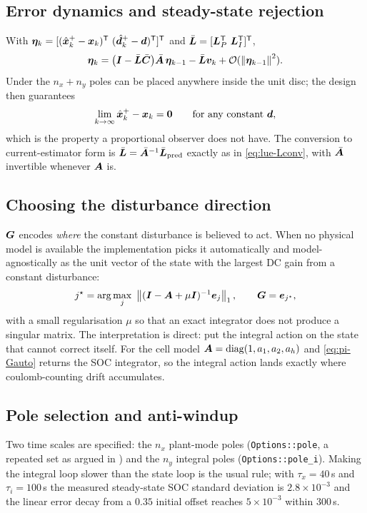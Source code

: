\subsection{Error dynamics and steady-state rejection}
With $\bm{\eta}_k = [(\xplus_k-\vx_k)^\T\ (\hat{\bm{d}}^+_k-\bm{d})^\T]^\T$ and
$\bar{\bm{L}} = [\bm{L}_P^{\mathsf{T}}\ \bm{L}_I^{\mathsf{T}}]^{\mathsf{T}}$,
\begin{equation}
\bm{\eta}_k = \big(\bm{I} - \bar{\bm{L}}\bar{\bm{C}}\big)\bar{\bm{A}}\,\bm{\eta}_{k-1}
            - \bar{\bm{L}}\bm{v}_k + \mathcal{O}(\left\lVert \bm{\eta}_{k-1} \right\rVert^2) .
\label{eq:pi-err}
\end{equation}
Under  the $n_x+n_y$ poles can be placed anywhere inside the unit disc; the
design then guarantees
\begin{equation}
\lim_{k\to\infty}\hat{\bm{x}}^{+}_k - \bm{x}_k = \bm{0}
\qquad\text{for any constant }\bm{d},
\label{eq:pi-zero}
\end{equation}
which is the property a proportional observer does not have.  The conversion to
current-estimator form is $\bar{\bm{L}} = \bar{\bm{A}}^{-1}\bar{\bm{L}}_{\mathrm{pred}}$ exactly as in
\eqref{eq:lue-Lconv}, with $\bar{\bm{A}}$ invertible whenever $\bm{A}$ is.

\subsection{Choosing the disturbance direction}
\label{sec:pi-G}
$\bm{G}$ encodes \emph{where} the constant disturbance is believed to act.  When no physical model
is available the implementation picks it automatically and model-agnostically as the unit vector
of the state with the largest DC gain from a constant disturbance:
\begin{equation}
j^\star = \arg\max_j \ \left\lVert (\bm{I}-\bm{A}+\mu\bm{I})^{-1} \bm{e}_j \right\rVert_1 ,
\qquad \bm{G} = \bm{e}_{j^\star} ,
\label{eq:pi-Gauto}
\end{equation}
with a small regularisation $\mu$ so that an exact integrator does not produce a singular
matrix.  The interpretation is direct: put the integral action on the state that cannot correct
itself.  For the cell model $\bm{A} = \operatorname{diag}(1,a_1,a_2,a_h)$ and \eqref{eq:pi-Gauto} returns the SOC
integrator, so the integral action lands exactly where coulomb-counting drift accumulates.

\subsection{Pole selection and anti-windup}
Two time scales are specified: the $n_x$ plant-mode poles (\texttt{Options::pole}, a repeated
set as argued in ) and the $n_y$ integral poles
(\texttt{Options::pole\_i}).  Making the integral loop slower than the state loop is the usual
rule; with $\tau_x = 40$\,s and $\tau_i = 100$\,s the measured steady-state SOC standard
deviation is $2.8\times10^{-3}$ and the linear error decay from a $0.35$ initial offset reaches
$5\times10^{-3}$ within 300\,s.


